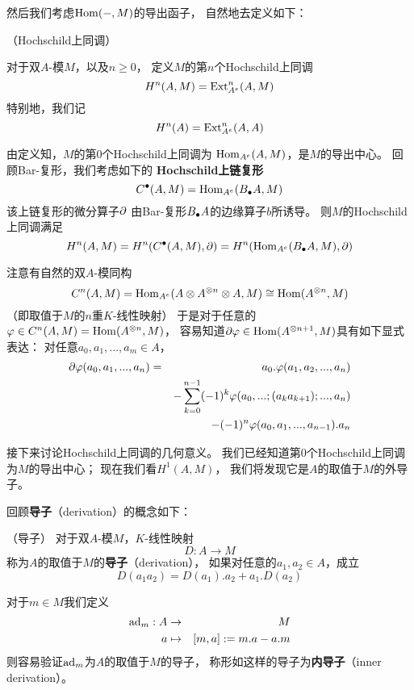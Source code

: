 然后我们考虑$\operatorname{Hom}(-,M)$的导出函子，
自然地去定义如下：

\begin{definition}（Hochschild上同调）

对于双$A$-模$M$，以及$n\geq 0$，
定义$M$的第$n$个Hochschild上同调
$$H^n(A,M)=\operatorname{Ext}_{A^e}^n(A,M)$$
特别地，我们记
$$H^n(A)=\operatorname{Ext}_{A^e}^n(A,A)$$
\end{definition}

由定义知，$M$的第$0$个Hochschild上同调为
$\operatorname{Hom}_{A^e}(A,M)$，是$M$的导出中心。
回顾Bar-复形，我们考虑如下的
\textbf{Hochschild上链复形}
$$C^{\bullet}(A,M)=\operatorname{Hom}_{A^e}(B_{\bullet} A,M)$$
该上链复形的微分算子$\partial$
由Bar-复形$B_{\bullet} A$的边缘算子$b$所诱导。
则$M$的Hochschild上同调满足
$$H^n(A,M)=H^n(C^{\bullet}(A,M),\partial)
=H^n(\operatorname{Hom}_{A^e}(B_{\bullet} A,M),\partial)$$

注意有自然的双$A$-模同构
$$C^n(A,M)
=\operatorname{Hom}_{A^e}(A\otimes A^{\otimes n}\otimes A,M)
\cong\operatorname{Hom}(A^{\otimes n},M)$$
（即取值于$M$的$n$重$K$-线性映射）
于是对于任意的$\varphi\in C^n(A,M)=\operatorname{Hom}(A^{\otimes n},M)$，
容易知道$\partial\varphi\in\operatorname{Hom}(A^{\otimes n+1},M)$具有如下显式表达：
对任意$a_0,a_1,...,a_m\in A$，
\begin{eqnarray*}
    \partial\varphi(a_0,a_1,...,a_n)
&=& a_0.\varphi(a_1,a_2,...,a_n)\\
&&- \sum_{k=0}^{n-1}(-1)^k
       \varphi(a_0,...;(a_ka_{k+1});...,a_n)\\
&&-  (-1)^n\varphi(a_0,a_1,...,a_{n-1}).a_n
\end{eqnarray*}


接下来讨论Hochschild上同调的几何意义。
我们已经知道第0个Hochschild上同调为$M$的导出中心；
现在我们看$H^1(A,M)$，
我们将发现它是$A$的取值于$M$的外导子。

回顾\textbf{导子}（derivation）的概念如下：

\begin{definition}（导子）
对于双$A$-模$M$，$K$-线性映射
$$D:A\to M$$
称为$A$的取值于$M$的\textbf{导子}（derivation），
如果对任意的$a_1,a_2\in A$，成立
$$D(a_1a_2)=D(a_1).a_2+a_1.D(a_2)$$
\end{definition}

对于$m\in M$我们定义
\begin{eqnarray*}
\operatorname{ad}_m:A&\to& M\\
a&\mapsto& [m,a]:=m.a-a.m
\end{eqnarray*}
则容易验证$\operatorname{ad}_m$为$A$的取值于$M$的导子，
称形如这样的导子为\textbf{内导子}（inner derivation）。

